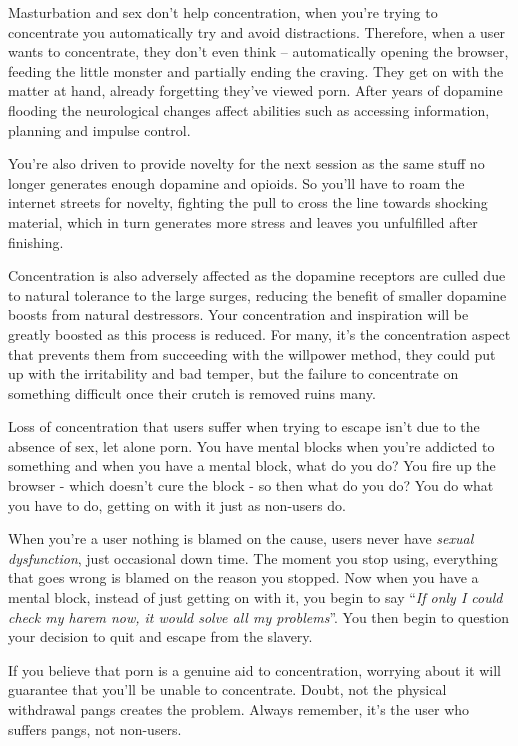 \documentclass[
]{book}
\begin{document}
Masturbation and sex don't help concentration, when you're trying to concentrate you automatically try and avoid distractions. Therefore, when a user wants to concentrate, they don't even think -- automatically opening the browser, feeding the little monster and partially ending the craving. They get on with the matter at hand, already forgetting they've viewed porn. After years of dopamine flooding the neurological changes affect abilities such as accessing information, planning and impulse control.

You're also driven to provide novelty for the next session as the same stuff no longer generates enough dopamine and opioids. So you'll have to roam the internet streets for novelty, fighting the pull to cross the line towards shocking material, which in turn generates more stress and leaves you unfulfilled after finishing.

Concentration is also adversely affected as the dopamine receptors are culled due to natural tolerance to the large surges, reducing the benefit of smaller dopamine boosts from natural destressors. Your concentration and inspiration will be greatly boosted as this process is reduced. For many, it's the concentration aspect that prevents them from succeeding with the willpower method, they could put up with the irritability and bad temper, but the failure to concentrate on something difficult once their crutch is removed ruins many.

Loss of concentration that users suffer when trying to escape isn't due to the absence of sex, let alone porn. You have mental blocks when you're addicted to something and when you have a mental block, what do you do? You fire up the browser - which doesn't cure the block - so then what do you do? You do what you have to do, getting on with it just as non-users do.

When you're a user nothing is blamed on the cause, users never have \emph{sexual dysfunction}, just occasional down time. The moment you stop using, everything that goes wrong is blamed on the reason you stopped. Now when you have a mental block, instead of just getting on with it, you begin to say ``\emph{If only I could check my harem now, it would solve all my problems}''. You then begin to question your decision to quit and escape from the slavery.

If you believe that porn is a genuine aid to concentration, worrying about it will guarantee that you'll be unable to concentrate. Doubt, not the physical withdrawal pangs creates the problem. Always remember, it's the user who suffers pangs, not non-users.
\end{document}
